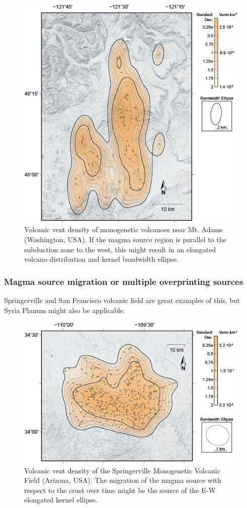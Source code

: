 \documentclass[12pt,letter]{article}
\begin{document}
\begin{figure}
\centering
\includegraphics[width=0.6\linewidth]{figures/adams_kde_72dpi}
\caption{Volcanic vent density of monogenetic volcanoes near Mt. Adams (Washington, USA). If the magma source region is parallel to the subduction zone to the west, this might result in an elongated volcano distribution and kernel bandwidth ellipse.}
\label{fig_adamskde}
\end{figure}


\subsubsection{Magma source migration or multiple overprinting sources}
Springerville and San Francisco volcanic field are great examples of this, but Syria Planum might also be applicable.

\begin{figure}
\centering
\includegraphics[width=0.6\linewidth]{figures/springerville_kde_72dpi}
\caption{Volcanic vent density of the Springerville Monogenetic Volcanic Field (Arizona, USA). The migration of the magma source with respect to the crust over time might be the source of the E-W elongated kernel ellipse.}
\label{fig_springervillekde}
\end{figure}
\end{document}
